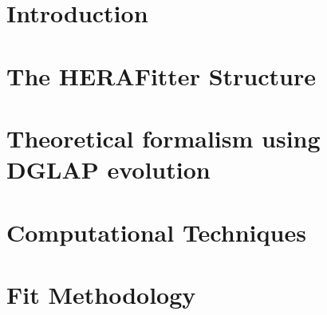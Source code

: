 \begin{abstract}
%
\end{abstract}
   

            

\section{Introduction}
\label{sec:intro}

\section{The HERAFitter Structure}

\section{Theoretical formalism using DGLAP evolution}
\label{sec:theory}



%
\section{Computational Techniques}
\label{sec:techniques}


\section{Fit Methodology}
\label{sec:method}


